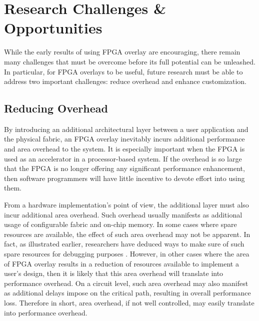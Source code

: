 



\section{Research Challenges \& Opportunities}
%
While the early results of using FPGA overlay are encouraging, there remain many challenges that must be overcome before its full potential can be unleashed.
%
In particular, for FPGA overlays to be useful, future research must be able to address two important challenges: reduce overhead and enhance customization.

\subsection{Reducing Overhead}
By introducing an additional architectural layer between a user application and the physical fabric, an FPGA overlay inevitably incurs additional performance and area overhead to the system.
It is especially important when the FPGA is used as an accelerator in a processor-based system. 
If the overhead is so large that the FPGA is no longer offering any significant performance enhancement, then software programmers will have little incentive to devote effort into using them.

From a hardware implementation's point of view, the additional layer must also incur additional area overhead.
Such overhead usually manifests as additional usage of configurable fabric and on-chip memory.
In some cases where spare resources are available, the effect of such area overhead may not be apparent.
In fact, as illustrated earlier, researchers have deduced ways to make sure of such spare resources for debugging purposes \cite{Hung:2013:TSO:2435264.2435272}.
However, in other cases where the area of FPGA overlay results in a reduction of resources available to implement a user's design, then it is likely that this area overhead will translate into performance overhead.
On a circuit level, such area overhead may also manifest as additional delays impose on the critical path, resulting in overall performance loss.
Therefore in short, area overhead, if not well controlled, may easily translate into performance overhead.

